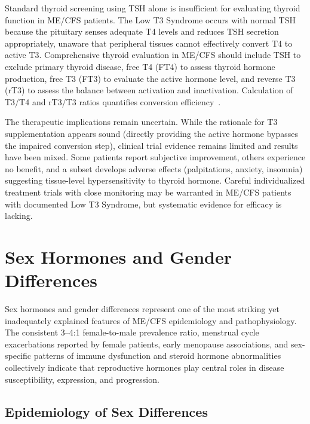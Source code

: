 \begin{warning}
\label{warn:thyroid-testing}
Standard thyroid screening using TSH alone is insufficient for evaluating thyroid function in ME/CFS patients. The Low T3 Syndrome occurs with normal TSH because the pituitary senses adequate T4 levels and reduces TSH secretion appropriately, unaware that peripheral tissues cannot effectively convert T4 to active T3. Comprehensive thyroid evaluation in ME/CFS should include TSH to exclude primary thyroid disease, free T4 (FT4) to assess thyroid hormone production, free T3 (FT3) to evaluate the active hormone level, and reverse T3 (rT3) to assess the balance between activation and inactivation. Calculation of T3/T4 and rT3/T3 ratios quantifies conversion efficiency~\cite{ruiznunez2018thyroid}.
\end{warning}

The therapeutic implications remain uncertain. While the rationale for T3 supplementation appears sound (directly providing the active hormone bypasses the impaired conversion step), clinical trial evidence remains limited and results have been mixed. Some patients report subjective improvement, others experience no benefit, and a subset develops adverse effects (palpitations, anxiety, insomnia) suggesting tissue-level hypersensitivity to thyroid hormone. Careful individualized treatment trials with close monitoring may be warranted in ME/CFS patients with documented Low T3 Syndrome, but systematic evidence for efficacy is lacking.

\section{Sex Hormones and Gender Differences}
\label{sec:sex-hormones}

Sex hormones and gender differences represent one of the most striking yet inadequately explained features of ME/CFS epidemiology and pathophysiology. The consistent 3--4:1 female-to-male prevalence ratio, menstrual cycle exacerbations reported by female patients, early menopause associations, and sex-specific patterns of immune dysfunction and steroid hormone abnormalities collectively indicate that reproductive hormones play central roles in disease susceptibility, expression, and progression.

\subsection{Epidemiology of Sex Differences}

